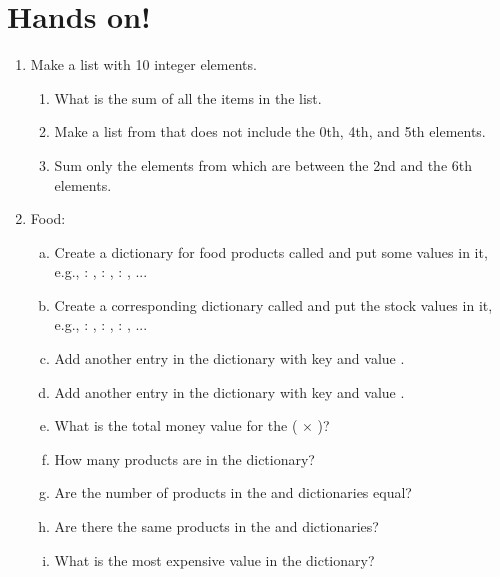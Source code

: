 \documentclass[aspectratio=1610,slidestop]{beamer}
\begin{document}
\section{Hands on!}
\begin{pframe}
 \vspace{-0.5cm}
 \begin{enumerate}
  \item Make a list  with 10 integer elements.
  \begin{enumerate}[a]
  \item What is the sum of all the items in the  list.
  \item Make a list  from  that does not include the 0th, 4th, and 5th elements.
  \item Sum only the elements from  which are between the 2nd and the 6th elements.
  \end{enumerate}
  \item Food:
  \begin{enumerate}[a.]
   \item Create a dictionary for food products called  and put some
       values in it, e.g., : , : ,
          : , ...
      \item Create a corresponding dictionary called  and put the stock
          values in it, e.g., : , :
          , : , ...
   \item Add another entry in the  dictionary with key
        and value .
   \item Add another entry in the  dictionary with key
        and value .
   \item What is the total money value for the  ( $\times$ )?
   \item How many products are in the  dictionary?\\
   \item Are the number of products in the  and  dictionaries equal?
   \item Are there the same products in the  and  dictionaries?
   \item What is the most expensive value in the  dictionary?
  \end{enumerate}
 \end{enumerate}
\end{pframe}


\end{document}

